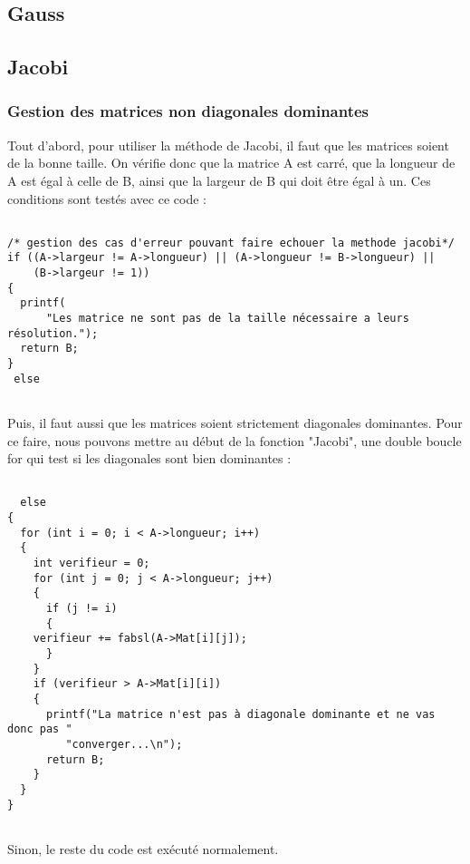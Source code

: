 \documentclass[letter]{article}
\begin{document}
\subsection{Gauss}
\label{sec:org2b49530}

\subsection{Jacobi}
\label{sec:org68185ca}

\subsubsection{Gestion des matrices non diagonales dominantes}
\label{sec:orgd8bdd70}


Tout d'abord, pour utiliser la méthode de Jacobi, il faut que les matrices soient de la bonne taille. On vérifie donc que la matrice A est carré, que la longueur de A est égal à celle de B, ainsi que la largeur de B qui doit être égal à un. Ces conditions sont testés avec ce code :
\begin{verbatim}

/* gestion des cas d'erreur pouvant faire echouer la methode jacobi*/
if ((A->largeur != A->longueur) || (A->longueur != B->longueur) ||
    (B->largeur != 1))
{
  printf(
      "Les matrice ne sont pas de la taille nécessaire a leurs résolution.");
  return B;
}
 else


\end{verbatim}



Puis, il faut aussi que les matrices soient strictement diagonales dominantes.
Pour ce faire, nous pouvons mettre au début de la fonction "Jacobi", une double boucle for qui test si les diagonales sont bien dominantes :

\begin{verbatim}

  else
{
  for (int i = 0; i < A->longueur; i++)
  {
    int verifieur = 0;
    for (int j = 0; j < A->longueur; j++)
    {
      if (j != i)
      {
	verifieur += fabsl(A->Mat[i][j]);
      }
    }
    if (verifieur > A->Mat[i][i])
    {
      printf("La matrice n'est pas à diagonale dominante et ne vas donc pas "
	     "converger...\n");
      return B;
    }
  }
}


\end{verbatim}


Sinon, le reste du code est exécuté normalement.
\end{document}
